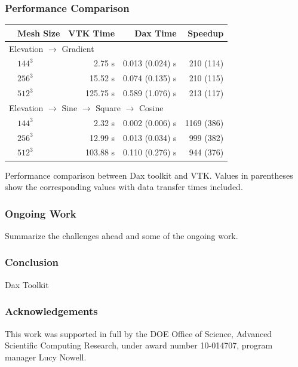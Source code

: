 \documentclass[brown]{beamer}
\begin{document}
\frame
{
  \frametitle{Performance Comparison}
  \begin{table}[htbp]
    \centering
    \label{tab:Results}
    \begin{tabular}{llrrr}
      \qquad & Mesh Size & VTK Time & Dax Time & Speedup \\
      \hline
      \multicolumn{5}{l}{Elevation $\rightarrow$ Gradient} \\
      & $144^3$ & 2.75 s & 0.013 (0.024) s & 210 (114) \\
      & $256^3$ &  15.52 s & 0.074 (0.135) s & 210 (115) \\
      & $512^3$ &  125.75 s & 0.589 (1.076) s &  213 (117) \\
      \multicolumn{5}{l}{Elevation $\rightarrow$ Sine $\rightarrow$ Square $\rightarrow$ Cosine} \\
      & $144^3$ & 2.32 s & 0.002 (0.006) s &  1169 (386) \\
      & $256^3$ &  12.99 s & 0.013 (0.034) s & 999 (382) \\
      & $512^3$ & 103.88 s & 0.110 (0.276) s &  944 (376) \\
    \end{tabular} 
  \end{table}
  {Performance comparison between Dax toolkit and VTK. Values in
  parentheses show the corresponding values with data transfer times
  included}.
}

\frame
{
  \frametitle{Ongoing Work}
  Summarize the challenges ahead and some of the ongoing work.
}

\frame
{
  \frametitle{Conclusion}
  Dax Toolkit
}

\frame
{
  \frametitle{Acknowledgements}
  This work was supported in full by the DOE Office of Science, Advanced
  Scientific Computing Research, under award number 10-014707, program manager
  Lucy Nowell.
}
\end{document}
